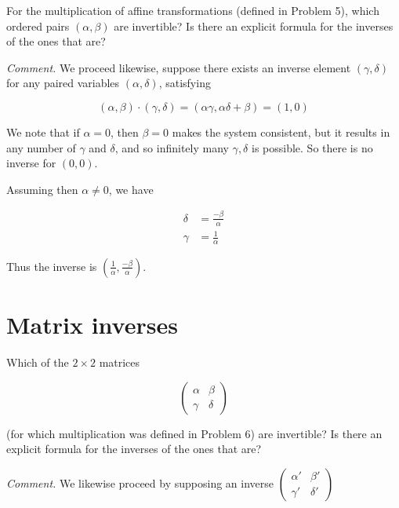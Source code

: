 \begin{problem}
For the multiplication of affine transformations (defined in Problem 5), which ordered pairs $(\alpha, \beta)$ are invertible? Is there an explicit formula for the inverses of the ones that are?
\end{problem}

\textit{Comment.} We proceed likewise, suppose there exists an inverse element $(\gamma, \delta)$ for any paired variables $(\alpha, \delta)$, satisfying

\begin{equation}
    (\alpha, \beta) \boxed{\cdot} (\gamma, \delta) = (\alpha\gamma, \alpha\delta + \beta) = (1,0)
\end{equation}

We note that if $\alpha = 0$, then $\beta = 0$ makes the system consistent, but it results in any number of $\gamma$ and $\delta$, and so infinitely many $\gamma, \delta$ is possible. So there is no inverse for $(0,0)$.

Assuming then $\alpha \neq 0$, we have

\begin{align}
    \delta & = \frac{-\beta}{\alpha} \\
    \gamma & = \frac{1}{\alpha}
\end{align}

Thus the inverse is $(\frac{1}{\alpha}, \frac{-\beta}{\alpha})$.

\section{Matrix inverses}

\begin{problem}
Which of the $2 \times 2$ matrices

\[
    \begin{pmatrix}
        \alpha & \beta  \\
        \gamma & \delta
    \end{pmatrix}
\]

(for which multiplication was defined in Problem 6) are invertible? Is there an explicit formula for the inverses of the ones that are?
\end{problem}

\textit{Comment.} We likewise proceed by supposing an inverse $\begin{pmatrix}
        \alpha' & \beta'  \\
        \gamma' & \delta'
    \end{pmatrix}$

